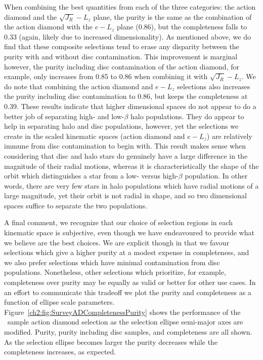 When combining the best quantities from each of the three categories: the action diamond and the $\sqrt{J_{R}}-L_{z}$ plane, the purity is the same as the combination of the action diamond with the $e-L_{z}$ plane (0.86), but the completeness falls to 0.33 (again, likely due to increased dimensionality). As mentioned above, we do find that these composite selections tend to erase any disparity between the purity with and without disc contamination. This improvement is marginal however, the purity including disc contamination of the action diamond, for example, only increases from 0.85 to 0.86 when combining it with $\sqrt{J_{R}}-L_{z}$. We do note that combining the action diamond and $e-L_{z}$ selections also increases the purity including disc contamination to 0.86, but keeps the completeness at 0.39. These results indicate that higher dimensional spaces do not appear to do a better job of separating high- and low-$\beta$ halo populations. They do appear to help in separating halo and disc populations, however, yet the selections we create in the scaled kinematic spaces (action diamond and $e-L_{z}$) are relatively immune from disc contamination to begin with. This result makes sense when considering that disc and halo stars do genuinely have a large difference in the magnitude of their radial motions, whereas it is characteristically the shape of the orbit which distinguishes a star from a low- versus high-$\beta$ population. In other words, there are very few stars in halo populations which have radial motions of a large magnitude, yet their orbit is not radial in shape, and so two dimensional spaces suffice to separate the two populations. 

A final comment, we recognize that our choice of selection regions in each kinematic space is subjective, even though we have endeavoured to provide what we believe are the best choices. We are explicit though in that we favour selections which give a higher purity at a modest expense in completeness, and we also prefer selections which have minimal contamination from disc populations. Nonetheless, other selections which prioritize, for example, completeness over purity may be equally as valid or better for other use cases. In an effort to communicate this tradeoff we plot the purity and completeness as a function of ellipse scale parameters. Figure~\ref{ch2:fig:SurveyADCompletenessPurity} shows the performance of the \survey\ sample action diamond selection as the selection ellipse semi-major axes are modified. Purity, purity including disc samples, and completeness are all shown. As the selection ellipse becomes larger the purity decreases while the completeness increases, as expected.

